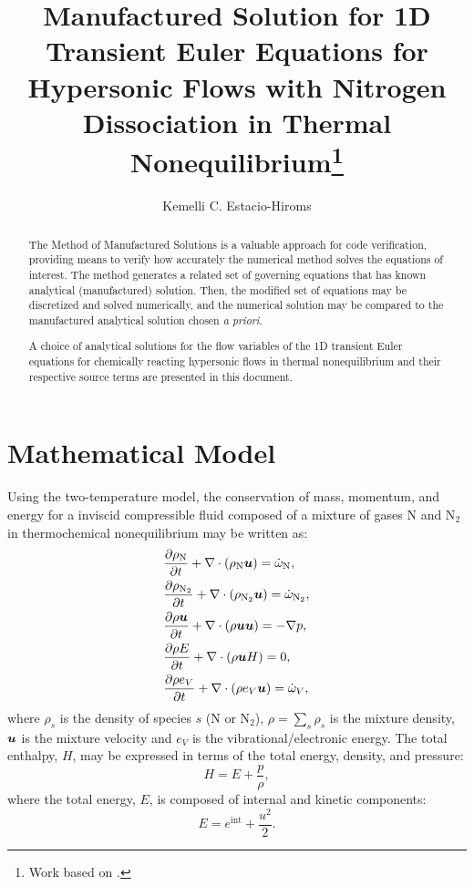 \documentclass[10pt]{article}
\title{Manufactured Solution for 1D Transient Euler Equations for Hypersonic Flows with Nitrogen Dissociation in Thermal Nonequilibrium\footnote{Work based on \citet*{Kirk2009}.}}
\author{Kemelli C. Estacio-Hiroms}
\newcommand{\diff}[2] {\dfrac{\partial #1 }{\partial #2}}
\newcommand{\bv}[1]{\ensuremath{\mbox{\boldmath$ #1 $}}}
\begin{document}
\maketitle
\tableofcontents
\begin{abstract}
The Method of Manufactured Solutions is a valuable approach for code verification, providing means to verify how accurately the numerical method solves the equations of interest. The method generates a related set of governing equations that has known analytical (manufactured) solution. Then, the modified set of equations may be discretized and solved numerically, and the numerical solution may be compared to the manufactured analytical solution  chosen \textit{a priori}.

A choice of analytical solutions for the flow variables of the 1D transient Euler equations for chemically reacting hypersonic flows in thermal nonequilibrium  and their respective source terms are presented in this document.
\end{abstract}





\section{Mathematical Model}
Using the two-temperature model, the conservation of mass, momentum, and energy for a inviscid compressible fluid composed of a  mixture of gases N and N$_2$ in thermochemical nonequilibrium may be written as:
\begin{align}
\label{eq:euler:rhoN}
&\diff{\rho_{\text{N}}}{t}+\nabla \cdot \left(\rho_{\text{N}} \bv{u}\right) = \dot{\omega}_{\text{N}},\vspace{5pt} \\
 \label{eq:euler:rhoN2}
&\diff{\rho_{\text{N}_2}}{t}+\nabla \cdot \left(\rho_{\text{N}_2}\bv{u}\right) = \dot{\omega}_{\text{N}_2},\vspace{5pt}\\
\label{eq:euler:u}
&\diff{\rho\bv{u}}{t}+\nabla\cdot\left(\rho\bv{u}\bv{u}\right) = -\nabla p,\vspace{5pt} \\
\label{eq:euler:E}
&\diff{\rho E}{t}+\nabla\cdot\left(\rho \bv{u} H\right) = 0,\vspace{5pt} \\
\label{eq:euler:eV}
&\diff{\rho e_V}{t}+\nabla\cdot (\rho e_V \bv{u})= \dot{\omega}_V ,
\end{align}
%
where $\rho_s$ is the density of species $s$ (N or N$_2$), $\rho=\sum_s \rho_s$ is the mixture density,  $ \bv{u} $ is the mixture velocity and $e_V$ is  the vibrational/electronic energy. 
%
The total enthalpy, $H$, may be expressed in terms of the total energy, density, and pressure:
$$H = E + \dfrac{p}{\rho},$$
where the total energy, $E$, is composed of internal and kinetic components: $$E = e^{\text{int}} + \dfrac{ u^2 }{2}.$$ 
\end{document}

